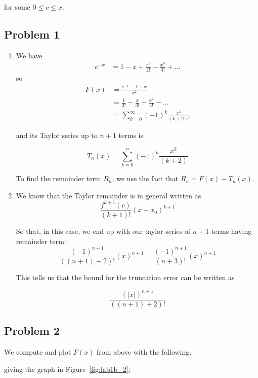\documentclass[letter,11pt]{article}
\begin{document}
for some $0 \leq c \leq x$.

\subsection{Problem 1}
\begin{enumerate}[label=\alph*.]
  \item We have \begin{align*}
    e^{-x} &= 1 - x + \frac{x^2}{2!} - \frac{x^3}{3!} + \dots
  \end{align*}
  so
  \begin{align*}
    F(x) &= \frac{e^{-x} - 1 + x}{x^2} \\
    &= \frac{1}{2!} - \frac{x}{3!} + \frac{x^2}{4!} - \dots \\
    &= \sum_{k = 0}^\infty (-1)^k \frac{x^k}{(k + 2)!}
  \end{align*}

  and its Taylor series up to $n + 1$ terms is

  $$
  T_n(x) = \sum_{k = 0}^n (-1)^k \frac{x^k}{(k + 2)}
  $$

  To find the remainder term $R_n$, we use the fact that $R_n = F(x) - T_n(x)$. 
  \item We know that the Taylor remainder is in general written as
  $$\frac{f^{k+1}(c)}{(k+1)!}(x-x_0)^{k+1}$$

 So that, in this case, we end up with our taylor series of $n+1$ terms having remainder term:
 $$\frac{(-1)^{n+1}}{((n+1)+2)!}(x)^{n+1} = \frac{(-1)^{n+1}}{(n+3)!}(x)^{n+1}$$

 This tells us that the bound for the truncation error can be written as

 $$\frac{(|x|)^{n+1}}{((n+1)+2)!}$$
\end{enumerate}

\newpage
\subsection{Problem 2}
We compute and plot $F(x)$ from above with the following.
  
  

  

giving the graph in Figure~\ref{fig:lab1b_2}:
\end{document}
